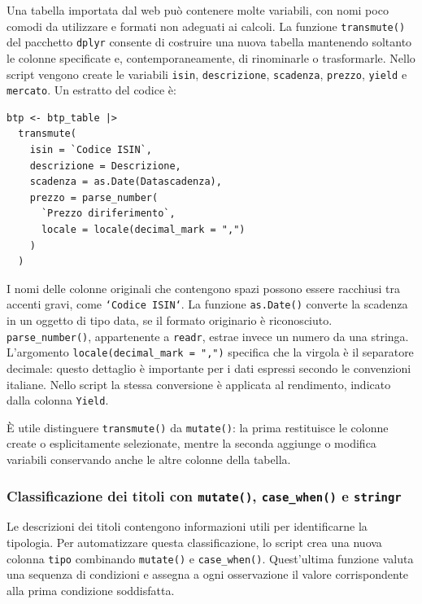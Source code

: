 Una tabella importata dal web può contenere molte variabili, con nomi poco comodi da utilizzare e formati non adeguati ai calcoli. La funzione \texttt{transmute()} del pacchetto \texttt{dplyr} consente di costruire una nuova tabella mantenendo soltanto le colonne specificate e, contemporaneamente, di rinominarle o trasformarle. Nello script vengono create le variabili \texttt{isin}, \texttt{descrizione}, \texttt{scadenza}, \texttt{prezzo}, \texttt{yield} e \texttt{mercato}. Un estratto del codice è:
\begin{verbatim}
btp <- btp_table |>
  transmute(
    isin = `Codice ISIN`,
    descrizione = Descrizione,
    scadenza = as.Date(Datascadenza),
    prezzo = parse_number(
      `Prezzo diriferimento`,
      locale = locale(decimal_mark = ",")
    )
  )
\end{verbatim}
I nomi delle colonne originali che contengono spazi possono essere racchiusi tra accenti gravi, come \texttt{`Codice ISIN`}. La funzione \texttt{as.Date()} converte la scadenza in un oggetto di tipo data, se il formato originario è riconosciuto. \texttt{parse\_number()}, appartenente a \texttt{readr}, estrae invece un numero da una stringa. L'argomento \texttt{locale(decimal\_mark = ",")} specifica che la virgola è il separatore decimale: questo dettaglio è importante per i dati espressi secondo le convenzioni italiane. Nello script la stessa conversione è applicata al rendimento, indicato dalla colonna \texttt{Yield}.

È utile distinguere \texttt{transmute()} da \texttt{mutate()}: la prima restituisce le colonne create o esplicitamente selezionate, mentre la seconda aggiunge o modifica variabili conservando anche le altre colonne della tabella.

\subsubsection{Classificazione dei titoli con \texttt{mutate()}, \texttt{case\_when()} e \texttt{stringr}}

Le descrizioni dei titoli contengono informazioni utili per identificarne la tipologia. Per automatizzare questa classificazione, lo script crea una nuova colonna \texttt{tipo} combinando \texttt{mutate()} e \texttt{case\_when()}. Quest'ultima funzione valuta una sequenza di condizioni e assegna a ogni osservazione il valore corrispondente alla prima condizione soddisfatta.

